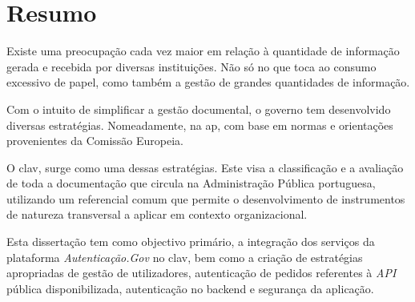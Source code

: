 \chapter*{Resumo}

Existe uma preocupação cada vez maior em relação à quantidade de informação gerada e recebida por diversas instituições. Não só no que toca ao consumo excessivo de papel, como também a gestão de grandes quantidades de informação.

Com o intuito de simplificar a gestão documental, o governo tem desenvolvido diversas estratégias. Nomeadamente, na \gls{ap}, com base em normas e orientações provenientes da Comissão Europeia.

O \gls{clav}, surge como uma dessas estratégias. Este visa a classificação e a avaliação de toda a documentação que circula na Administração Pública portuguesa, utilizando um referencial comum que permite o desenvolvimento de instrumentos de natureza transversal a aplicar em contexto organizacional.

Esta dissertação tem como objectivo primário, a integração dos serviços da plataforma \emph{Autenticação.Gov} no \gls{clav}, bem como a criação de estratégias apropriadas de gestão de utilizadores, autenticação de pedidos referentes à \emph{API} pública disponibilizada, autenticação no backend e segurança da aplicação.

\vspace{5cm}

